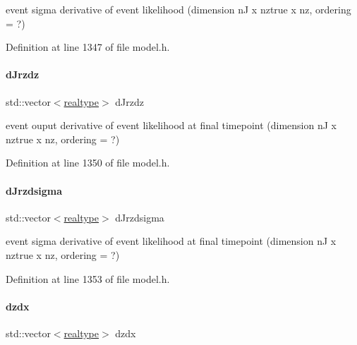 event sigma derivative of event likelihood (dimension nJ x nztrue x nz, ordering = ?) 

Definition at line 1347 of file model.\+h.

\mbox{\label{classamici_1_1_model_a80eade42075bbd373d5531c6fd7cd877}} 
\paragraph{\texorpdfstring{dJrzdz}{dJrzdz}}
{\footnotesize\ttfamily std\+::vector$<$\mbox{\hyperlink{namespaceamici_a1bdce28051d6a53868f7ccbf5f2c14a3}{realtype}}$>$ d\+Jrzdz\hspace{0.3cm}{\ttfamily [protected]}}

event ouput derivative of event likelihood at final timepoint (dimension nJ x nztrue x nz, ordering = ?) 

Definition at line 1350 of file model.\+h.

\mbox{\label{classamici_1_1_model_ad38f72dc10596ffb60d0472dc4b7eade}} 
\paragraph{\texorpdfstring{dJrzdsigma}{dJrzdsigma}}
{\footnotesize\ttfamily std\+::vector$<$\mbox{\hyperlink{namespaceamici_a1bdce28051d6a53868f7ccbf5f2c14a3}{realtype}}$>$ d\+Jrzdsigma\hspace{0.3cm}{\ttfamily [protected]}}

event sigma derivative of event likelihood at final timepoint (dimension nJ x nztrue x nz, ordering = ?) 

Definition at line 1353 of file model.\+h.

\mbox{\label{classamici_1_1_model_a2f5f73b0bb67ee69c461c01e2dadaecc}} 
\paragraph{\texorpdfstring{dzdx}{dzdx}}
{\footnotesize\ttfamily std\+::vector$<$\mbox{\hyperlink{namespaceamici_a1bdce28051d6a53868f7ccbf5f2c14a3}{realtype}}$>$ dzdx\hspace{0.3cm}{\ttfamily [protected]}}

